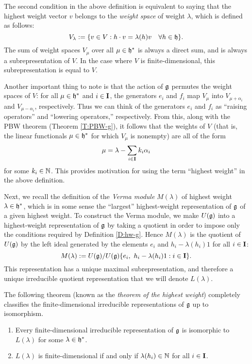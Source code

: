 The second condition in the above definition is equivalent to saying that the highest weight vector $v$ belongs to the \emph{weight space} of weight $\lambda$, which is defined as follows:
\[V_\lambda := \{v\in V : h\cdot v = \lambda(h)v \quad \forall h\in\mathfrak{h}\}.\]
The sum of weight spaces $V_\mu$ over all $\mu\in\mathfrak{h}^*$ is always a direct sum, and is always a subrepresentation of $V$.
In the case where $V$ is finite-dimensional, this subrepresentation is equal to $V$.

Another important thing to note is that the action of $\mathfrak{g}$ permutes the weight spaces of $V$: for all $\mu\in\mathfrak{h}^*$ and $i\in\mathbf{I}$, the generators $e_i$ and $f_i$ map $V_\mu$ into $V_{\mu+\alpha_i}$ and $V_{\mu-\alpha_i}$, respectively.
Thus we can think of the generators $e_i$ and $f_i$ as ``raising operators'' and ``lowering operators,'' respectively.
From this, along with the PBW theorem (Theorem \ref{T:PBW-g}), it follows that the weights of $V$ (that is, the linear functionals $\mu\in\mathfrak{h}^*$ for which $V_\mu$ is nonempty) are all of the form
\[\mu = \lambda - \sum_{i\in\mathbf{I}} k_i\alpha_i\]
for some $k_i\in\mathbb{N}$.
This provides motivation for using the term ``highest weight'' in the above definition.

Next, we recall the definition of the \emph{Verma module} $M(\lambda)$ of highest weight $\lambda\in\mathfrak{h}^*$, which is in some sense the ``largest'' highest-weight representation of $\mathfrak{g}$ of a given highest weight.
To construct the Verma module, we make $U(\mathfrak{g})$ into a highest-weight representation of $\mathfrak{g}$ by taking a quotient in order to impose only the conditions required by Definition \ref{D:hw-g}.
Hence $M(\lambda)$ is the quotient of $U(\mathfrak{g})$ by the left ideal generated by the elements $e_i$ and $h_i-\lambda(h_i)1$ for all $i\in\mathbf{I}$:
\[M(\lambda) := U(\mathfrak{g}) / U(\mathfrak{g}) \{e_i,\ h_i-\lambda(h_i)1 : i\in\mathbf{I}\}.\]
This representation has a unique maximal subrepresentation, and therefore a unique irreducible quotient representation that we will denote $L(\lambda)$.

The following theorem (known as the \emph{theorem of the highest weight}) completely classifies the finite-dimensional irreducible representations of $\mathfrak{g}$ up to isomorphism.

\begin{theorem}\label{T:hw-g}
    \begin{enumerate}
        \item Every finite-dimensional irreducible representation of $\mathfrak{g}$ is isomorphic to $L(\lambda)$ for some $\lambda\in\mathfrak{h}^*$.
        \item $L(\lambda)$ is finite-dimensional if and only if $\lambda(h_i)\in\mathbb{N}$ for all $i\in\mathbf{I}$.
    \end{enumerate}
\end{theorem}

